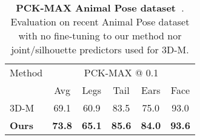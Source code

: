 \begin{table}[!htbp]
    \begin{tabular}{@{}lccccc@{}}
    \toprule
    \multicolumn{1}{l}{Method} & 
    \multicolumn{5}{c}{PCK-MAX @ 0.1} \\
    \multicolumn{1}{c}{} &
    \multicolumn{1}{c}{Avg} &
    \multicolumn{1}{c}{Legs} &
    \multicolumn{1}{c}{Tail} &
    \multicolumn{1}{c}{Ears} &
    \multicolumn{1}{c}{Face} \\
    \midrule
    3D-M~\cite{zuffi2017menagerie} & 69.1 & 60.9 & 83.5 & 75.0 & 93.0 \\
    \textbf{Ours} & \textbf{73.8} & \textbf{65.1} & \textbf{85.6} & \textbf{84.0} & \textbf{93.6} \\
    \bottomrule
    \end{tabular}
    \caption{
        \label{tab:animalpose}
        \textbf{PCK-MAX Animal Pose dataset~\cite{animalpose}}. Evaluation on recent Animal Pose dataset with no fine-tuning to our method nor joint/silhouette predictors used for 3D-M.}
\end{table}
    